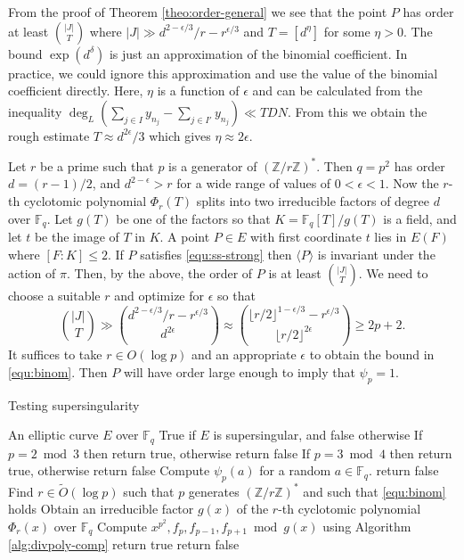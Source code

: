 \documentclass[12pt]{article}
\theoremstyle{plain}
\theoremstyle{definition}
\newcommand{\ang}[1]{\langle#1\rangle}
\newcommand{\abs}[1]{\left\vert#1\right\vert}
\newcommand{\tildO}{\tilde{O}}
\def\Z{\ensuremath{\mathbb{Z}}}
\def\F{\ensuremath{\mathbb{F}}}
\begin{document}
From the proof of Theorem \ref{theo:order-general} we see that the point $P$ has order at least 
$\binom{\abs{J}}{T}$ where $\abs{J} \gg d^{2 - \epsilon / 3} / r - r^{\epsilon / 3}$ and $T = 
[d^\eta]$ for some $\eta > 0$. The bound $\exp(d^\delta)$ is just an approximation of the binomial 
coefficient. In practice, we could ignore this approximation and use the value of the binomial 
coefficient directly. Here, $\eta$ is a function of $\epsilon$ and can be calculated from the 
inequality $\deg_L(\sum_{j \in I}y_{n_j} - \sum_{j \in I'}y_{n_j}) \ll TDN $. From this we obtain 
the rough estimate $T \approx d^{2\epsilon} / 3$ which gives $\eta \approx 2\epsilon$. 

Let $r$ be a prime such that $p$ is a generator of $(\Z/r\Z)^*$. Then $q = p^2$ has order $d = (r - 
1) / 2$, and $d^{2 - \epsilon} > r$ for a wide range of values of $0 < \epsilon < 1$. Now the 
$r$-th cyclotomic polynomial $\Phi_r(T)$ splits into two irreducible factors of degree $d$ over 
$\F_q$. Let $g(T)$ be one of the factors so that $K = \F_q[T]/g(T)$ is a field, and let $t$ be the 
image of $T$ in $K$. A point $P \in E$ with first coordinate $t$ lies in $E(F)$ where $[F : K] \le 
2$. If $P$ satisfies \eqref{equ:ss-strong} then $\ang{P}$ is invariant under the action of $\pi$. 
Then, by the above, the order of $P$ is at least $\binom{\abs{J}}{T}$. We need to choose a suitable 
$r$ and optimize for $\epsilon$ so that
\begin{equation}
	\label{equ:binom}
	\binom{\abs{J}}{T} \gg \binom{d^{2 - \epsilon / 3} / r - r^{\epsilon / 3}}{d^{2\epsilon}} 
	\approx \binom{\lfloor r / 2 \rfloor^{1 - \epsilon / 3} - r^{\epsilon / 3}}{\lfloor r / 2 
	\rfloor^{2\epsilon}} \ge 2p + 2.
\end{equation}
It suffices to take $r \in O(\log p)$ and an appropriate $\epsilon$ to obtain the bound in 
\eqref{equ:binom}. Then $P$ will have order large enough to imply that $\psi_p = 1$. 

\begin{algorithm}[H]
	\caption{Testing supersingularity}
	\label{alg:ss-strong}
	\begin{algorithmic}[1]
		\Require An elliptic curve $E$ over $\F_q$
		\Ensure True if $E$ is supersingular, and false otherwise
			\State If $p = 2 \bmod 3$ then return true, otherwise return false
		\EndIf
			\State If $p = 3 \bmod 4$ then return true, otherwise return false
		\EndIf
		\State\label{step:ss-eval}%
		Compute $\psi_p(a)$ for a random $a \in \F_q$.
			\State return false
		\EndIf
		\State\label{step:ss-find-par}%
		Find $r \in \tildO(\log p)$ such that $p$ generates $(\Z/r\Z)^*$ and such that 
		\eqref{equ:binom} holds
		\State\label{step:cyclo}%
		Obtain an irreducible factor $g(x)$ of the $r$-th cyclotomic polynomial $\Phi_r(x)$ over 
		$\F_q$
		\State\label{step:ss-psi}%
		Compute $x^{p^2}, f_p, f_{p - 1}, f_{p + 1} \bmod g(x)$ using Algorithm 
		\ref{alg:divpoly-comp}
			\State return true
		\Else
			\State return false
		\EndIf
	\end{algorithmic}
\end{algorithm}
\end{document}
